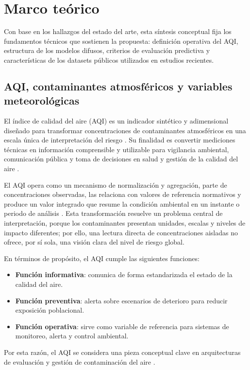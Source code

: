 \section{Marco teórico}

Con base en los hallazgos del estado del arte, esta síntesis conceptual fija los fundamentos técnicos que sostienen la propuesta: definición operativa del AQI, estructura de los modelos difusos, criterios de evaluación predictiva y características de los datasets públicos utilizados en estudios recientes.

\subsection{AQI, contaminantes atmosféricos y variables meteorológicas}
El índice de calidad del aire (AQI) es un indicador sintético y adimensional diseñado para transformar concentraciones de contaminantes atmosféricos en una escala única de interpretación del riesgo \cite{ART01,ART02}. Su finalidad es convertir mediciones técnicas en información comprensible y utilizable para vigilancia ambiental, comunicación pública y toma de decisiones en salud y gestión de la calidad del aire \cite{ART01,ART02}.

El AQI opera como un mecanismo de normalización y agregación, parte de concentraciones observadas, las relaciona con valores de referencia normativos y produce un valor integrado que resume la condición ambiental en un instante o periodo de análisis \cite{ART01,ART02}. Esta transformación resuelve un problema central de interpretación, porque los contaminantes presentan unidades, escalas y niveles de impacto diferentes; por ello, una lectura directa de concentraciones aisladas no ofrece, por sí sola, una visión clara del nivel de riesgo global.

En términos de propósito, el AQI cumple las siguientes funciones:
\begin{itemize}
\item \textbf{Función informativa}: comunica de forma estandarizada el estado de la calidad del aire.
\item \textbf{Función preventiva}: alerta sobre escenarios de deterioro para reducir exposición poblacional.
\item \textbf{Función operativa}: sirve como variable de referencia para sistemas de monitoreo, alerta y control ambiental.
\end{itemize}

Por esta razón, el AQI se considera una pieza conceptual clave en arquitecturas de evaluación y gestión de contaminación del aire \cite{ART01,ART02}.


